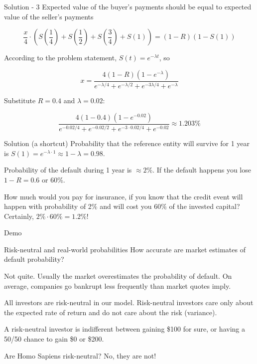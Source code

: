 \documentclass{beamer}
\begin{document}
\begin{frame}{Solution - 3}
\justify
Expected value of the buyer's payments should be equal to expected value of the seller's payments

\begin{equation*}
\frac{x}{4} \cdot \left( S\left(\frac{1}{4}\right) + S\left(\frac{1}{2}\right) + S\left(\frac{3}{4}\right) +S\left(1\right) \right) = (1 - R)(1 - S(1))
\end{equation*}

According to the problem statement, $S(t)=e^{-\lambda t}$, so

\begin{equation*}
x = \frac{4(1 - R)(1 - e^{-\lambda})}{e^{-\lambda / 4} + e^{-\lambda / 2} + e^{-3\lambda / 4} + e^{-\lambda}}
\end{equation*}

Substitute $R = 0.4$ and $\lambda = 0.02$:

\begin{equation*}
\frac{4(1 - 0.4)(1 - e^{-0.02})}{e^{-0.02 / 4} + e^{-0.02 / 2} + e^{-3\cdot0.02 / 4} + e^{-0.02}} \approx 1.203\%
\end{equation*}
\end{frame}



\begin{frame}{Solution (a shortcut)}
\justify
Probability that the reference entity will survive for 1 year is $S(1) = e^{-\lambda \cdot 1} \approx 1 - \lambda = 0.98$.

\justify
Probability of the default during 1 year is $\approx 2\%$. If the default happens you lose $1 - R = 0.6$ or $60\%$.

\justify
How much would you pay for insurance, if you know that the credit event will happen with probability of 2\% and will cost you 60\% of the invested capital? Certainly, $2\% \cdot 60\% = 1.2\%$! 
\end{frame}



\begin{frame}{Demo}
\end{frame}



\begin{frame}{Risk-neutral and real-world probabilities}
\justify
How accurate are market estimates of default probability?

\justify
Not quite. Usually the market overestimates the probability of default. On average, companies go bankrupt less frequently than market quotes imply.

\justify
All investors are \alert{risk-neutral} in our model. Risk-neutral investors care only about the expected rate of return and do not care about the risk (variance).

\justify
A risk-neutral investor is indifferent between gaining \$100 for sure, or having a 50/50 chance to gain \$0 or \$200.

\justify
Are Homo Sapiens risk-neutral? No, they are not!
\end{frame}
\end{document}
